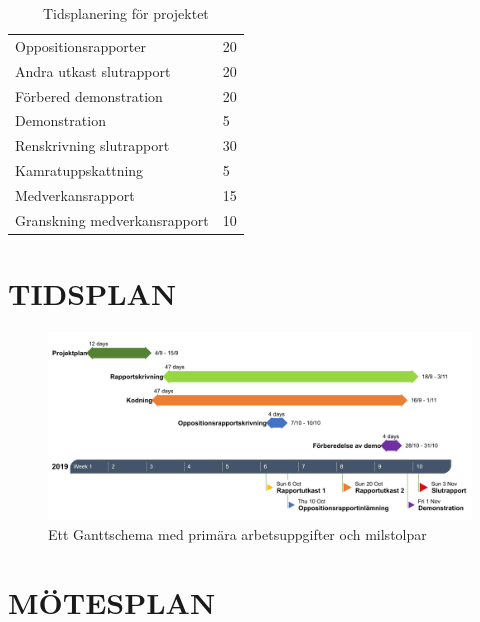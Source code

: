 \documentclass[a4paper]{article}
\begin{document}
\begin{table}[b]
\begin{tabular}{|l|l|}
Oppositionsrapporter                                      & 20               \\
Andra utkast slutrapport                                  & 20               \\
Förbered demonstration                                    & 20               \\
Demonstration                                             & 5               \\
Renskrivning slutrapport                                  & 30               \\
Kamratuppskattning                                        & 5                \\
Medverkansrapport                                         & 15               \\
Granskning medverkansrapport                              & 10               \\ \hline
\end{tabular}
\caption{Tidsplanering för projektet}
\label{tab:aktiviteter}
\end{table}

\section{TIDSPLAN}
\label{sec:tidsplan}

\begin{figure}[!ht]
	\includegraphics[width=1\textwidth]{figurer/Gantt.png}
	\caption{Ett Ganttschema med primära arbetsuppgifter och milstolpar}
	\label{fig:Gantt}
\end{figure}

\section{MÖTESPLAN}
\label{sec:mötesplan}
\end{document}
